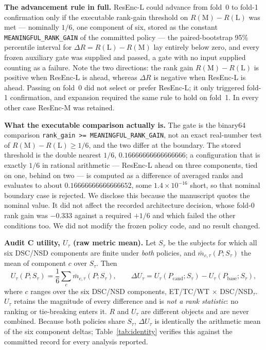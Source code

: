 \documentclass[runningheads]{llncs}
\begin{document}
\medskip\noindent\textbf{The advancement rule in full.} ResEnc-L could advance from fold~0 to
fold-1 confirmation only if the executable rank-gain threshold on $R(\mathrm{M})-R(\mathrm{L})$ was
met --- nominally $1/6$, one component of six, stored as the constant
\texttt{MEANINGFUL\_\allowbreak RANK\_\allowbreak GAIN} of the committed policy --- the
paired-bootstrap 95\% percentile
interval for $\Delta R=R(\mathrm{L})-R(\mathrm{M})$ lay entirely below zero, and every frozen
auxiliary gate was supplied and passed, a gate with no input supplied counting as a failure. Note
the two directions: the rank gain $R(\mathrm{M})-R(\mathrm{L})$ is positive when ResEnc-L is ahead,
whereas $\Delta R$ is negative when ResEnc-L is ahead. Passing on fold~0 did not select or prefer
ResEnc-L; it only triggered fold-1 confirmation, and expansion required the same rule to hold on
fold~1. In every other case ResEnc-M was retained.

\medskip\noindent\textbf{What the executable comparison actually is.} The gate is the binary64
comparison \texttt{rank\_\allowbreak gain >= MEANINGFUL\_\allowbreak RANK\_\allowbreak GAIN}, not an
exact real-number test of $R(\mathrm{M})-R(\mathrm{L})\ge 1/6$, and the two differ at the boundary.
The stored threshold is the double nearest $1/6$, $0.16666666666666666$; a configuration that is
exactly $1/6$ in rational arithmetic --- ResEnc-L ahead on three components, tied on one, behind on
two --- is computed as a difference of averaged ranks and evaluates to about $0.16666666666666652$,
some $1.4\times10^{-16}$ short, so that nominal boundary case is rejected. We disclose this because
the manuscript quotes the nominal value. It did not affect the recorded architecture decision, whose
fold-0 rank gain was $-0.333$ against a required $+1/6$ and which failed the other conditions too.
We did not modify the frozen policy code, and no result changed.

\medskip\noindent\textbf{Audit C utility, $U_\tau$ (raw metric mean).} Let $S_\tau$ be the subjects
for which all six DSC/NSD components are finite under \emph{both} policies, and
$\bar m_{c,\tau}(P;S_\tau)$ the mean of component $c$ over $S_\tau$. Then
\[
U_\tau(P;S_\tau)=\frac{1}{6}\sum_{c}\bar m_{c,\tau}(P;S_\tau),
\qquad
\Delta U_\tau=U_\tau(P_{\mathrm{cand}};S_\tau)-U_\tau(P_{\mathrm{base}};S_\tau),
\]
where $c$ ranges over the six DSC/NSD components, ET/TC/WT $\times$ DSC/NSD$_\tau$.
$U_\tau$ retains the magnitude of every difference and is \emph{not a rank statistic}: no ranking
or tie-breaking enters it. $R$ and $U_\tau$ are different objects and are never combined. Because both
policies share $S_\tau$, $\Delta U_\tau$ is identically the arithmetic mean of the six component
deltas; Table~\ref{tab:identity} verifies this against the committed record for every analysis
reported.
\end{document}
